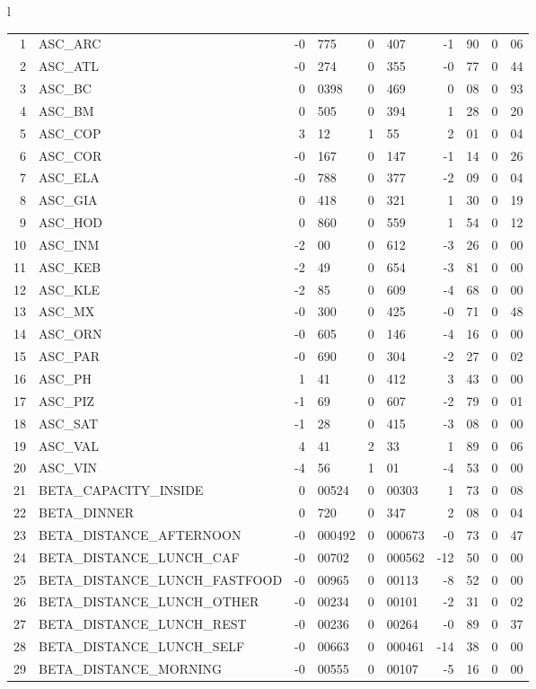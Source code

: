 \begin{tabular}{l}
\begin{tabular}{rlr@{.}lr@{.}lr@{.}lr@{.}l}
1 & ASC_ARC & -0&775 & 0&407 & -1&90 & 0&06\\
2 & ASC_ATL  & -0&274 & 0&355 & -0&77 & 0&44\\
3 & ASC_BC & 0&0398 & 0&469 & 0&08 & 0&93\\
4 & ASC_BM  & 0&505 & 0&394 & 1&28 & 0&20\\
5 & ASC_COP & 3&12 & 1&55 & 2&01 & 0&04\\
6 & ASC_COR  & -0&167 & 0&147 & -1&14 & 0&26\\
7 & ASC_ELA  & -0&788 & 0&377 & -2&09 & 0&04\\
8 & ASC_GIA  & 0&418 & 0&321 & 1&30 & 0&19\\
9 & ASC_HOD  & 0&860 & 0&559 & 1&54 & 0&12\\
10 & ASC_INM  & -2&00 & 0&612 & -3&26 & 0&00\\
11 & ASC_KEB  & -2&49 & 0&654 & -3&81 & 0&00\\
12 & ASC_KLE & -2&85 & 0&609 & -4&68 & 0&00\\
13 & ASC_MX  & -0&300 & 0&425 & -0&71 & 0&48\\
14 & ASC_ORN  & -0&605 & 0&146 & -4&16 & 0&00\\
15 & ASC_PAR  & -0&690 & 0&304 & -2&27 & 0&02\\
16 & ASC_PH  & 1&41 & 0&412 & 3&43 & 0&00\\
17 & ASC_PIZ  & -1&69 & 0&607 & -2&79 & 0&01\\
18 & ASC_SAT  & -1&28 & 0&415 & -3&08 & 0&00\\
19 & ASC_VAL  & 4&41 & 2&33 & 1&89 & 0&06\\
20 & ASC_VIN & -4&56 & 1&01 & -4&53 & 0&00\\
21 & BETA_CAPACITY_INSIDE & 0&00524 & 0&00303 & 1&73 & 0&08\\
22 & BETA_DINNER & 0&720 & 0&347 & 2&08 & 0&04\\
23 & BETA_DISTANCE_AFTERNOON & -0&000492 & 0&000673 & -0&73 & 0&47\\
24 & BETA_DISTANCE_LUNCH_CAF & -0&00702 & 0&000562 & -12&50 & 0&00\\
25 & BETA_DISTANCE_LUNCH_FASTFOOD & -0&00965 & 0&00113 & -8&52 & 0&00\\
26 & BETA_DISTANCE_LUNCH_OTHER & -0&00234 & 0&00101 & -2&31 & 0&02\\
27 & BETA_DISTANCE_LUNCH_REST & -0&00236 & 0&00264 & -0&89 & 0&37\\
28 & BETA_DISTANCE_LUNCH_SELF & -0&00663 & 0&000461 & -14&38 & 0&00\\
29 & BETA_DISTANCE_MORNING & -0&00555 & 0&00107 & -5&16 & 0&00\\

\end{tabular}
\end{tabular}
